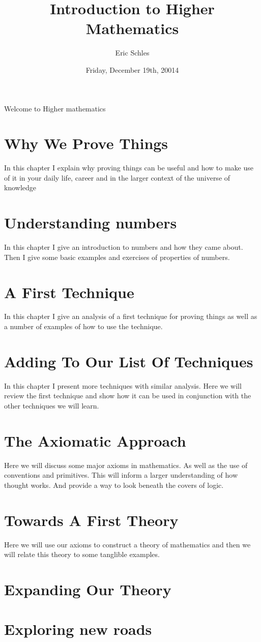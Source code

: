 \documentclass{book}
\title{Introduction to Higher Mathematics}
\author{Eric Schles}
\date{ Friday, December 19th, 20014}
\begin{document}
\maketitle
Welcome to Higher mathematics
\tableofcontents
\chapter{Why We Prove Things}
In this chapter I explain why proving things can be useful and how to make use of it in your daily life, career and in the larger context of the universe of knowledge
\chapter{Understanding numbers}
In this chapter I give an introduction to numbers and how they came about.  Then I give some basic examples and exercises of properties of numbers.  
\chapter{A First Technique}
In this chapter I give an analysis of a first technique for proving things as well as a number of examples of how to use the technique.
\chapter{Adding To Our List Of Techniques}
In this chapter I present more techniques with similar analysis.  Here we will review the first technique and show how it can be used in conjunction with the other techniques we will learn.
\chapter{The Axiomatic Approach}
Here we will discuss some major axioms in mathematics. As well as the use of conventions and primitives.  This will inform a larger understanding of how thought works. And provide a way to look beneath the covers of logic.
\chapter{Towards A First Theory}
Here we will use our axioms to construct a theory of mathematics and then we will relate this theory to some tanglible examples.
\chapter{Expanding Our Theory}

\chapter{Exploring new roads}
\end{document}

